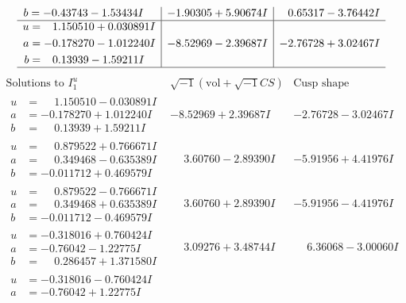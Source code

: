 \documentclass[1p]{elsarticle_modified}
\theoremstyle{definition}
\newcommand{\I}{\sqrt{-1}}
\begin{document}
$$\begin{array}{c|c|c}
\begin{aligned}
b &= -0.43743 - 1.53434 I\end{aligned}
 & -1.90305 + 5.90674 I & \phantom{-}0.65317 - 3.76442 I \\ \hline\begin{aligned}
u &= \phantom{-}1.150510 + 0.030891 I \\
a &= -0.178270 - 1.012240 I \\
b &= \phantom{-}0.13939 - 1.59211 I\end{aligned}
 & -8.52969 - 2.39687 I & -2.76728 + 3.02467 I\\
 \hline 
 \end{array}$$\newpage$$\begin{array}{c|c|c}  
\text{Solutions to }I^u_{1}& \I (\text{vol} + \sqrt{-1}CS) & \text{Cusp shape}\\
 \hline 
\begin{aligned}
u &= \phantom{-}1.150510 - 0.030891 I \\
a &= -0.178270 + 1.012240 I \\
b &= \phantom{-}0.13939 + 1.59211 I\end{aligned}
 & -8.52969 + 2.39687 I & -2.76728 - 3.02467 I \\ \hline\begin{aligned}
u &= \phantom{-}0.879522 + 0.766671 I \\
a &= \phantom{-}0.349468 - 0.635389 I \\
b &= -0.011712 + 0.469579 I\end{aligned}
 & \phantom{-}3.60760 - 2.89390 I & -5.91956 + 4.41976 I \\ \hline\begin{aligned}
u &= \phantom{-}0.879522 - 0.766671 I \\
a &= \phantom{-}0.349468 + 0.635389 I \\
b &= -0.011712 - 0.469579 I\end{aligned}
 & \phantom{-}3.60760 + 2.89390 I & -5.91956 - 4.41976 I \\ \hline\begin{aligned}
u &= -0.318016 + 0.760424 I \\
a &= -0.76042 - 1.22775 I \\
b &= \phantom{-}0.286457 + 1.371580 I\end{aligned}
 & \phantom{-}3.09276 + 3.48744 I & \phantom{-}6.36068 - 3.00060 I \\ \hline\begin{aligned}
u &= -0.318016 - 0.760424 I \\
a &= -0.76042 + 1.22775 I \\

\end{aligned}
\end{array}$$
\end{document}
